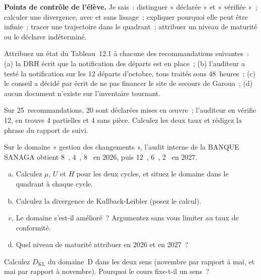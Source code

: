 \begin{boxinfo}
\textbf{Points de contrôle de l'élève.} Je sais~: distinguer « déclarée »
et « vérifiée »~; calculer une divergence, avec et sans lissage~; expliquer
pourquoi elle peut être infinie~; tracer une trajectoire dans le quadrant~;
attribuer un niveau de maturité ou le déclarer indéterminé.
\end{boxinfo}

\bigskip

\begin{boxexo}[title={\ding{45}\quad Exercice~12.1. Les états \niveaubase}]
Attribuez un état du Tableau~12.1 à chacune des recommandations suivantes~:
(a) la DRH écrit que la notification des départs est en place~; (b)
l'auditeur a testé la notification sur les 12 départs d'octobre, tous
traités sous 48~heures~; (c) le conseil a décidé par écrit de ne pas
financer le site de secours de Garoua~; (d) aucun document n'existe sur
l'inventaire tournant.
\end{boxexo}

\begin{boxexo}[title={\ding{45}\quad Exercice~12.2. Les deux taux \niveaubase}]
Sur 25~recommandations, 20 sont déclarées mises en œuvre~; l'auditeur en
vérifie 12, en trouve 4 partielles et 4 sans pièce. Calculez les deux taux
et rédigez la phrase du rapport de suivi.
\end{boxexo}

\begin{boxexo}[title={\ding{45}\quad Exercice~12.3. Une divergence \niveaumoyen}]
Sur le domaine « gestion des changements », l'audit interne de la BANQUE
SANAGA obtient 8~\OUI{}, 4~\NON{}, 8~\NEK{} en 2026, puis 12~\OUI{},
6~\NON{}, 2~\NEK{} en 2027.
\begin{enumerate}[(a)]
    \item Calculez $\mu$, $U$ et $H$ pour les deux cycles, et situez le
          domaine dans le quadrant à chaque cycle.
    \item Calculez la divergence de Kullback-Leibler (posez le calcul).
    \item Le domaine s'est-il amélioré~? Argumentez sans vous limiter au
          taux de conformité.
    \item Quel niveau de maturité attribuer en 2026 et en 2027~?
\end{enumerate}
\end{boxexo}

\begin{boxexo}[title={\ding{45}\quad Exercice~12.4. Non symétrique \niveaumoyen}]
Calculez $D_{\mathrm{KL}}$ du domaine~D dans les deux sens (novembre par
rapport à mai, et mai par rapport à novembre). Pourquoi le cours fixe-t-il un
sens~?
\end{boxexo}

